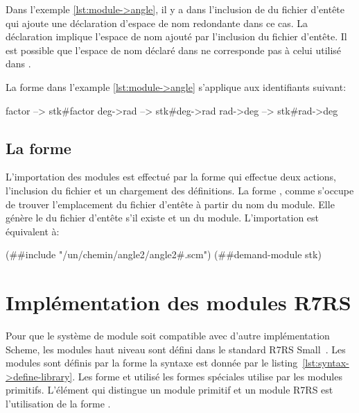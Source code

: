 Dans l'exemple \ref{lst:module->angle}, il y a dans  l'inclusion
de du fichier d'entête  qui ajoute une déclaration d'espace
de nom redondante dans ce cas.  La déclaration 
implique l'espace de nom ajouté par l'inclusion du fichier d'entête. Il est
possible que l'espace de nom déclaré dans  ne corresponde
pas à celui utilisé dans .

La forme  dans l'example \ref{lst:module->angle}
s'applique aux identifiants suivant:
\begin{center}
  \begin{mplisting}{0.3}
factor    --> stk#factor
deg->rad  --> stk#deg->rad
rad->deg  --> stk#rad->deg
\end{mplisting}
\end{center}

\subsection{La forme }
%
L'importation des modules est effectué par la forme  qui
effectue deux actions, l'inclusion du fichier  et un
chargement des définitions.  La forme , comme
 s'occupe de trouver l'emplacement du fichier d'entête
à partir du nom du module. Elle génère le  du fichier
d'entête s'il existe et un  du module.  L'importation
 est équivalent à:

\begin{center}
  \begin{mplisting}{0.9}
(##include "/un/chemin/angle2/angle2#.scm")
(##demand-module stk)
\end{mplisting}
\end{center}


\section{Implémentation des modules R7RS}
Pour que le système de module soit compatible avec d'autre implémentation
Scheme,  les modules haut niveau sont défini dans le standard R7RS
Small~\cite{Scheme:R7RS}. Les modules sont définis par la forme
 la syntaxe est donnée par le
listing~\ref{lst:syntax->define-library}. Les forme  et
 utilisé les formes spéciales utilise par les modules
primitifs. L'élément qui distingue un module primitif et un module R7RS
est l'utilisation de la forme .


